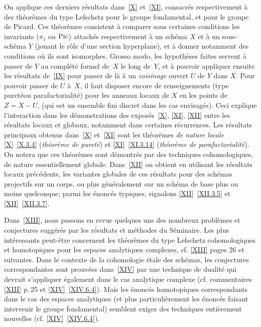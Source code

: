 On applique ces derniers r\'esultats dans~\ref{X} et~\ref{XI}, consacr\'es respectivement \`a des th\'eor\`emes du type Lefschetz pour le groupe fondamental, et pour le groupe de \hbox{Picard}. Ces th\'eor\`emes consistent \`a comparer sous certaines conditions les invariants ($\pi_1$ ou $\operatorname{Pic}$) attach\'es respectivement \`a un sch\'ema $X$ et \`a un sous-sch\'ema $Y$ (jouant le r\^{o}le d'une section hyperplane), et \`a donner notamment des conditions o\`u ils sont isomorphes. Grosso modo, les hypoth\`eses faites servent \`a passer de $Y$ au compl\'et\'e formel de~$X$ le long de~$Y$, et \`a pouvoir appliquer ensuite les r\'esultats de~\ref{IX} pour passer de l\`a \`a un \emph{voisinage} ouvert $U$ de $Y$ dans $X$. Pour pouvoir passer de $U$ \`a~$X$, il faut disposer encore de renseignements (type \og puret\'e\fg ou \og parafactorialit\'e{\fg}) pour les anneaux locaux de $X$ en les points de $Z=X-U$, (qui est un ensemble fini discret dans les cas envisag\'es). Ceci explique l'interaction dans les d\'emonstrations des expos\'es~\ref{X}, \ref{XI}, \ref{XII} entre les r\'esultats locaux et globaux, notamment dans certaines r\'ecurrences. Les r\'esultats principaux obtenus dans~\ref{X} et~\ref{XI} sont les th\'eor\`emes \emph{de nature locale} \ref{X}~\ref{X.3.4} (\emph{théorème de pureté}) et \ref{XI}~\ref{XI.3.14} (\emph{théorème de parafactorialité}). On notera que ces th\'eor\`emes sont d\'emontr\'es par des techniques cohomologiques, de nature essentiellement globale. Dans~\ref{XII} on obtient en utilisant les r\'esultats locaux pr\'ec\'edents, les variantes globales de ces r\'esultats pour des sch\'emas projectifs sur un corps, ou plus g\'en\'eralement sur un sch\'ema de base plus ou moins quelconque; parmi les \'enonc\'es typiques, signalons \ref{XII}~\ref{XII.3.5} et \ref{XII}~\ref{XII.3.7}.

Dans~\ref{XIII}, nous passons en revue quelques uns des nombreux probl\`emes et conjectures sugg\'er\'es par les r\'esultats et m\'ethodes du S\'eminaire. Les plus int\'eressants peut-\^etre concernent les th\'eor\`emes du type Lefschetz cohomologiques et homotopiques pour les espaces analytiques complexes, cf. \ref{XIII} pages 26 et suivantes. Dans le contexte de la cohomologie \'etale des sch\'emas, les conjectures correspondantes sont prouv\'ees dans~\ref{XIV} par une technique de dualit\'e qui devrait s'appliquer \'egalement dans le cas analytique complexe (cf. commentaires \ref{XIII} p.\,25 et \ref{XIV}~\ref{XIV.6.4}). Mais les \'enonc\'es homotopiques correspondants dans le cas des espaces analytiques (et plus particuli\`erement les \'enonc\'es faisant intervenir le groupe fondamental) semblent exiger des techniques enti\`erement nouvelles (cf. \ref{XIV}~\ref{XIV.6.4}).

